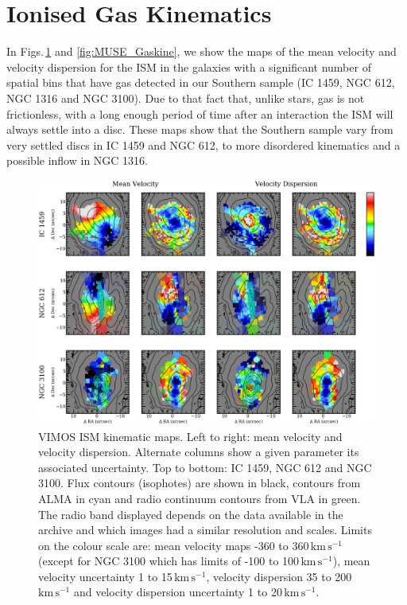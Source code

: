 		
		





\section{Ionised Gas Kinematics}
	\label{sec:GasKin}
	In Figs.\,\ref{fig:VIMOS_Gaskine} and \ref{fig:MUSE_Gaskine}, we show the maps of the mean velocity and velocity dispersion for the ISM in the galaxies with a significant number of spatial bins that have gas detected in our Southern sample (IC 1459, NGC 612, NGC 1316 and NGC 3100). Due to that fact that, unlike stars, gas is not frictionless, with a long enough period of time after an interaction the ISM will always settle into a disc. These maps show that the Southern sample vary from very settled discs in IC 1459 and NGC 612, to more disordered kinematics and a possible inflow in NGC 1316.

	\begin{figure}
		\centering
		\includegraphics[height=0.47\textheight]{chapter5/vimos/kin.png}
		\caption[VIMOS ISM kinematic maps]{VIMOS ISM kinematic maps. Left to right: mean velocity and velocity dispersion. Alternate columns show a given parameter its associated uncertainty. Top to bottom: IC 1459, NGC 612 and NGC 3100. Flux contours (isophotes) are shown in black,  contours from ALMA in cyan and radio continuum contours from VLA in green. The radio band displayed depends on the data available in the archive and which images had a similar resolution and scales. Limits on the colour scale are: mean velocity maps -360 to 360\,$\mathrm{km \, s^{-1}}$ (except for NGC 3100 which has limits of -100 to 100\,$\mathrm{km \, s^{-1}}$), mean velocity uncertainty 1 to 15\,$\mathrm{km \, s^{-1}}$, velocity dispersion 35 to 200\,$\mathrm{km \, s^{-1}}$ and velocity dispersion uncertainty 1 to 20\,$\mathrm{km \, s^{-1}}$.} 
		\label{fig:VIMOS_Gaskine}
	\end{figure}

